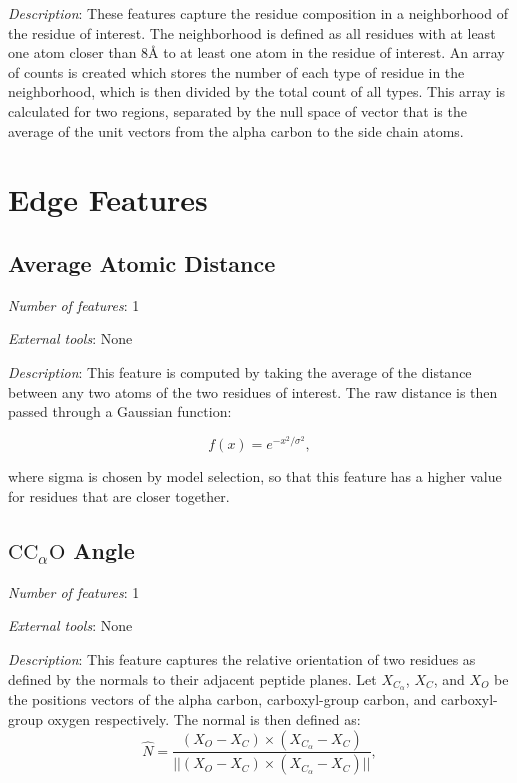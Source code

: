 \noindent
\emph{Description}:
These features capture the residue composition in a neighborhood of the residue of interest.
The neighborhood is defined as all residues with at least one atom closer than 8\AA{} to at least one atom in the residue of interest.
An array of counts is created which stores the number of each type of residue in the neighborhood, which is then divided by the total count of all types.
This array is calculated for two regions, separated by the null space of vector that is the average of the unit vectors from the alpha carbon to the side chain atoms.


\section{Edge Features}

\subsection{Average Atomic Distance}
\noindent
\emph{Number of features}: 1

\noindent
\emph{External tools}: None

\noindent
\emph{Description}:
This feature is computed by taking the average of the distance between any two atoms of the two residues of interest.
The raw distance is then passed through a Gaussian function: 

\begin{equation}
f(x) = e^{-x^2 / \sigma^2},
\end{equation}

\noindent
where sigma is chosen by model selection, so that this feature has a higher value for residues that are closer together.


\subsection{$\text{CC}_{\alpha} \text{O}$ Angle}
\noindent
\emph{Number of features}: 1

\noindent
\emph{External tools}: None

\noindent
\emph{Description}:
This feature captures the relative orientation of two residues as defined by the normals to their adjacent peptide planes.
Let $X_{C_{\alpha}}$, $X_{C}$, and $X_{O}$ be the positions vectors of the alpha carbon, carboxyl-group carbon, and carboxyl-group oxygen respectively.
The normal is then defined as:
\begin{equation}
\hat{N} = \frac{(X_{O} - X_{C}) \times  (X_{C_\alpha} - X_{C})}{||(X_{O} - X_{C}) \times  (X_{C_\alpha} - X_{C})||}, 
\end{equation}


